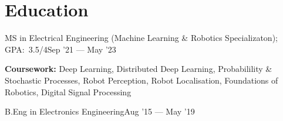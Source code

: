 \section{Education}
\SubHeadingListStart{}

{MS in Electrical Engineering (Machine Learning \& Robotics Specializaton);  GPA:\ 3.5/4}{Sep '21 --- May '23}
{ \item[]\footnotesize{\textbf{Coursework:} Deep Learning, Distributed Deep Learning, Probabilility \& Stochastic Processes,
Robot Perception, Robot Localisation, Foundations of Robotics, Digital Signal Processing} \vspace{-4pt}}

{B.Eng in Electronics Engineering}{Aug '15 --- May '19}

\SubHeadingListEnd{}{}{}
